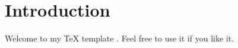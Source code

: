 \documentclass{article}
\begin{document}


\section{Introduction}

Welcome to my TeX template \cite{Boyd2023}.  Feel free to use it if you like it.




\end{document}
